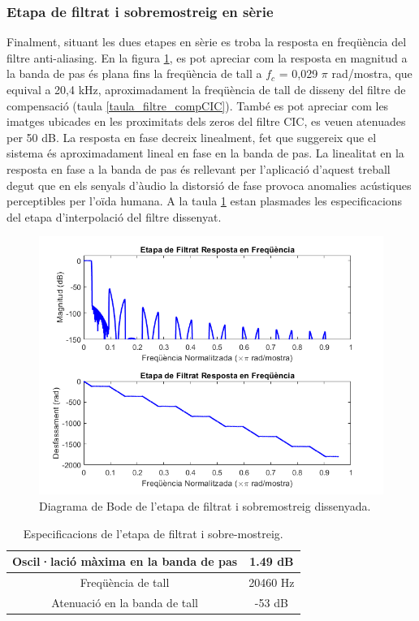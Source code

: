 \subsubsection{Etapa de filtrat i sobremostreig en sèrie}
\par Finalment, situant les dues etapes en sèrie es troba la resposta en freqüència del filtre anti-aliasing. En la figura \ref{fig_BodeEtapaFiltre}, es pot apreciar com la resposta en magnitud a la banda de pas és plana fins la freqüència de tall a $f_c$ = 0,029 $\pi$ rad/mostra, que equival a 20,4 kHz, aproximadament la freqüència de tall de disseny del filtre de compensació (taula \ref{taula_filtre_compCIC}). També es pot apreciar com les imatges ubicades en les proximitats dels zeros del filtre CIC, es veuen atenuades per 50 dB. La resposta en fase decreix linealment, fet que suggereix que el sistema és aproximadament lineal en fase en la banda de pas. La linealitat en la resposta en fase a la banda de pas és rellevant per l'aplicació d'aquest treball degut que en els senyals d'àudio la distorsió de fase provoca anomalies acústiques perceptibles per l'oïda humana. A la taula \ref{taula_mesuresEtapaInterp} estan plasmades les especificacions del etapa d'interpolació del filtre dissenyat.
\begin{figure}[H]
    \centering
    \includegraphics[width=0.5\linewidth]{Images/Etapa_FiltreInterp.png}
    \caption{Diagrama de Bode de l'etapa de filtrat i sobremostreig dissenyada.}
    \label{fig_BodeEtapaFiltre}
\end{figure}
\begin{table}[H]
    \begin{center}
    \begin{tabular}{ | c | c | }
        \hline
        \centering
        Oscil·lació màxima en la banda de pas & 1.49 dB \\ \hline
        \centering
        Freqüència de tall   &  20460 Hz\\ \hline
        \centering
        Atenuació en la banda de tall & -53 dB \\ \hline
    \end{tabular}
    \end{center}
    \caption{Especificacions de l'etapa de filtrat i sobre-mostreig.}
    \label{taula_mesuresEtapaInterp}
\end{table}


